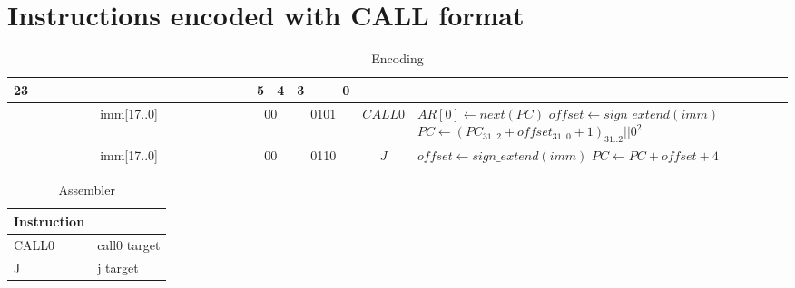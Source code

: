 \section{Instructions encoded with CALL format}
	\begin{longtable}{llllllllllllllllllllllll  p{1cm}  p{7cm} | }
		\caption{Encoding\label{long}}\\
		23 & & & & & & & & & & & & & & & & & & 5 & 4 & 3 & & & 0 & &
		\multicolumn{1}{c}{}\\
		\hline
		\multicolumn{18}{|c|}{imm[17..0]} & \multicolumn{2}{c|}{00} & \multicolumn{4}{c|}{0101} & \multicolumn{1}{c|}{$CALL0$} & $AR[0] \leftarrow next(PC)$ \newline $offset \leftarrow sign\_extend(imm)$ \newline $PC \leftarrow (PC_{31..2}+offset_{31..0}+1)_{31..2}||0^2$\\ \hline
		\multicolumn{18}{|c|}{imm[17..0]} & \multicolumn{2}{c|}{00} & \multicolumn{4}{c|}{0110} & \multicolumn{1}{c|}{$J$} & $offset \leftarrow sign\_extend(imm)$ \newline $PC \leftarrow PC + offset + 4$\\ \hline
	\end{longtable}

	\begin{longtable}{|p{5cm}|p{5cm}|}
		\caption{Assembler\label{long}}\\
		\hline
		Instruction & \\
		\hline
		CALL0 & call0 target\\ \hline
		J & j target\\ \hline
	\end{longtable}
